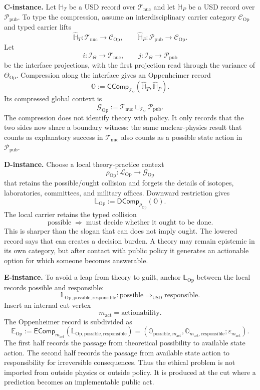 \documentclass[11pt]{article}
\newcommand{\USD}{\mathsf{USD}}
\newcommand{\defeq}{\mathrel{:=}}
\newcommand{\CComp}{\mathsf{CComp}}
\newcommand{\DComp}{\mathsf{DComp}}
\newcommand{\EComp}{\mathsf{EComp}}
\theoremstyle{definition}
\theoremstyle{plain}
\begin{document}
\textbf{C-instance.}  Let $\mathbb H_T$ be a USD record over
$\mathcal T_{\mathrm{nuc}}$ and let $\mathbb H_P$ be a USD record over
$\mathcal P_{\mathrm{pub}}$.  To type the compression, assume an
interdisciplinary carrier category $\mathcal C_{\mathrm{Op}}$ and typed
carrier lifts
\[
  \widehat{\mathbb H}_T:
  \mathcal T_{\mathrm{nuc}}\to\mathcal C_{\mathrm{Op}},
  \qquad
  \widehat{\mathbb H}_P:
  \mathcal P_{\mathrm{pub}}\to\mathcal C_{\mathrm{Op}}.
\]
Let
\[
  i:\mathcal I_{\Theta}\to\mathcal T_{\mathrm{nuc}},
  \qquad
  j:\mathcal I_{\Theta}\to\mathcal P_{\mathrm{pub}}
\]
be the interface projections, with the first projection read through the
variance of $\Theta_{\mathrm{Op}}$.  Compression along the interface gives
an Oppenheimer record
\[
  \mathbb O
  \defeq
  \CComp_{\mathcal I_{\Theta}}
  (\widehat{\mathbb H}_T,\widehat{\mathbb H}_P).
\]
Its compressed global context is
\[
  \mathcal G_{\mathrm{Op}}
  \defeq
  \mathcal T_{\mathrm{nuc}}
  \sqcup_{\mathcal I_{\Theta}}
  \mathcal P_{\mathrm{pub}}.
\]
The compression does not identify theory with policy.  It only records
that the two sides now share a boundary witness: the same nuclear-physics
result that counts as explanatory success in $\mathcal T_{\mathrm{nuc}}$
also counts as a possible state action in $\mathcal P_{\mathrm{pub}}$.

\textbf{D-instance.}  Choose a local theory-practice context
\[
  \rho_{\mathrm{Op}}:
  \mathcal L_{\mathrm{Op}}\to\mathcal G_{\mathrm{Op}}
\]
that retains the possible/ought collision and forgets the details of
isotopes, laboratories, committees, and military offices.  Downward
restriction gives
\[
  \mathbb L_{\mathrm{Op}}
  \defeq
  \DComp_{\rho_{\mathrm{Op}}}(\mathbb O).
\]
The local carrier retains the typed collision
\[
  \text{possible}
  \;\Longrightarrow\;
  \text{must decide whether it ought to be done}.
\]
This is sharper than the slogan that can does not imply ought.  The
lowered record says that can creates a decision burden.  A theory may
remain epistemic in its own category, but after contact with public
policy it generates an actionable option for which someone becomes
answerable.

\textbf{E-instance.}  To avoid a leap from theory to guilt, anchor
$\mathbb L_{\mathrm{Op}}$ between the local records
$\mathrm{possible}$ and $\mathrm{responsible}$:
\[
  \mathbb L_{\mathrm{Op},\mathrm{possible},\mathrm{responsible}}:
  \mathrm{possible}\Rightarrow_{\USD}\mathrm{responsible}.
\]
Insert an
internal cut vertex
\[
  m_{\mathrm{act}}
  =
  \text{actionability}.
\]
The Oppenheimer record is subdivided as
\[
  \mathbb E_{\mathrm{Op}}
  \defeq
  \EComp_{m_{\mathrm{act}}}
  (\mathbb L_{\mathrm{Op},\mathrm{possible},\mathrm{responsible}})
  =
  (\mathbb O_{\mathrm{possible},m_{\mathrm{act}}},
   \mathbb O_{m_{\mathrm{act}},\mathrm{responsible}};
   \varepsilon_{m_{\mathrm{act}}}).
\]
The first half records the passage from theoretical possibility to
available state action.  The second half records the passage from
available state action to responsibility for irreversible consequences.
Thus the ethical problem is not imported from outside physics or outside
policy.  It is produced at the cut where a prediction becomes an
implementable public act.
\end{document}
